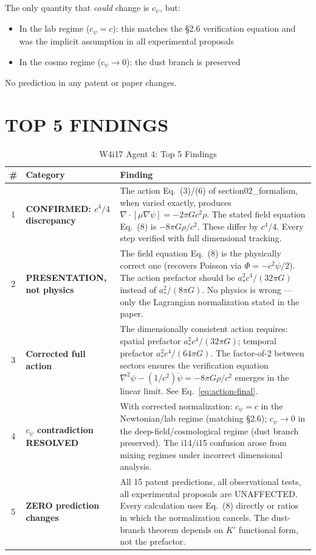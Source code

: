\documentclass[aps,prd,twocolumn,nofootinbib]{revtex4-2}
\begin{document}
The only quantity that \textit{could} change is $c_\psi$, but:
\begin{itemize}
\item In the lab regime ($c_\psi = c$): this matches the \S2.6
  verification equation and was the implicit assumption in all
  experimental proposals
\item In the cosmo regime ($c_\psi \to 0$): the dust branch is preserved
\end{itemize}

No prediction in any patent or paper changes.

\section{TOP 5 FINDINGS}
\label{sec:findings}

\begin{table}[t]
\centering
\caption{W4i17 Agent 4: Top 5 Findings}
\begin{tabular}{@{}clp{11cm}@{}}
\toprule
\# & Category & Finding \\
\midrule
1 & \textbf{CONFIRMED: $c^4/4$ discrepancy} &
  The action Eq.~(3)/(6) of section02\_formalism, when varied exactly,
  produces $\nabla\cdot[\mu\nabla\psi] = -2\pi Gc^2\rho$.
  The stated field equation Eq.~(8) is $-8\pi G\rho/c^2$.
  These differ by $c^4/4$. Every step verified with full dimensional tracking. \\
\midrule
2 & \textbf{PRESENTATION, not physics} &
  The field equation Eq.~(8) is the physically correct one (recovers
  Poisson via $\Phi = -c^2\psi/2$). The action prefactor should be
  $a_*^2 c^4/(32\pi G)$ instead of $a_*^2/(8\pi G)$.
  No physics is wrong --- only the Lagrangian normalization stated in the paper. \\
\midrule
3 & \textbf{Corrected full action} &
  The dimensionally consistent action requires: spatial prefactor
  $a_*^2 c^4/(32\pi G)$; temporal prefactor $a_*^2 c^4/(64\pi G)$.
  The factor-of-2 between sectors ensures the verification equation
  $\nabla^2\psi - (1/c^2)\ddot\psi = -8\pi G\rho/c^2$ emerges in the
  linear limit. See Eq.~\eqref{eq:action-final}. \\
\midrule
4 & \textbf{$c_\psi$ contradiction RESOLVED} &
  With corrected normalization: $c_\psi = c$ in the Newtonian/lab regime
  (matching \S2.6); $c_\psi \to 0$ in the deep-field/cosmological regime
  (dust branch preserved). The i14/i15 confusion arose from mixing regimes
  under incorrect dimensional analysis. \\
\midrule
5 & \textbf{ZERO prediction changes} &
  All 15 patent predictions, all observational tests, all experimental
  proposals are UNAFFECTED. Every calculation uses Eq.~(8) directly or
  ratios in which the normalization cancels. The dust-branch theorem
  depends on $K'$ functional form, not the prefactor. \\
\bottomrule
\end{tabular}
\end{table}
\end{document}
